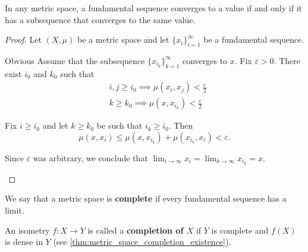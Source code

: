 \begin{proposition}\label{thm:fundamental_subsequence_convergence}
  In any metric space, a fundamental sequence converges to a value if and only if it has a subsequence that converges to the same value.
\end{proposition}
\begin{proof}
  Let \( (X, \mu) \) be a metric space and let \( \{ x_i \}_{i=1}^\infty \) be a fundamental sequence.

  \begin{description}
    \Implies Obvious
    \ImpliedBy Assume that the subsequence \( \{ x_{i_k} \}_{k=1}^\infty \) converges to \( x \). Fix \( \varepsilon > 0 \). There exist \( i_0 \) and \( k_0 \) such that
    \begin{align*}
      &i, j \geq i_0 \implies \mu(x_i, x_j) < \tfrac \varepsilon 2 \\
      &k \geq k_0 \implies \mu(x, x_{i_k}) < \tfrac \varepsilon 2
    \end{align*}

    Fix \( i \geq i_0 \) and let \( k \geq k_0 \) be such that \( i_k \geq i_0 \). Then
    \begin{equation*}
      \mu(x, x_i) \leq \mu(x, x_{i_k}) + \mu(x_{i_k}, x_i) < \varepsilon.
    \end{equation*}

    Since \( \varepsilon \) was arbitrary, we conclude that \( \lim_{i \to \infty} x_i = \lim_{k \to \infty} x_{i_k} = x \).
  \end{description}
\end{proof}

\begin{definition}\label{def:complete_metric_space}
  We say that a metric space is \textbf{complete} if every fundamental sequence has a limit.

  An isometry \( f: X \to Y \) is called a \textbf{completion of \( X \)} if \( Y \) is complete and \( f(X) \) is dense in \( Y \) (see \cref{thm:metric_space_completion_existence}).
\end{definition}

